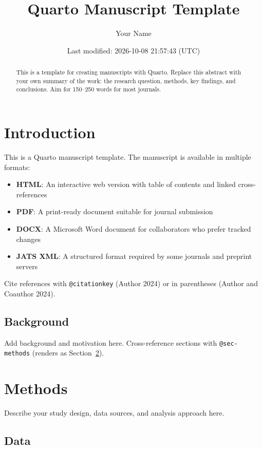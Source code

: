 \documentclass[
  letterpaper,
  DIV=11,
  numbers=noendperiod]{scrartcl}
\title{Quarto Manuscript Template}
\author{Your Name}
\date{Last modified: 2026-10-08 21:57:43 (UTC)}
\providecommand{\tightlist}{%
  \setlength{\itemsep}{0pt}\setlength{\parskip}{0pt}}
\begin{document}
\maketitle
\begin{abstract}
This is a template for creating manuscripts with Quarto. Replace this
abstract with your own summary of the work: the research question,
methods, key findings, and conclusions. Aim for 150--250 words for most
journals.
\end{abstract}


\section{Introduction}\label{sec-intro}

This is a Quarto manuscript template. The manuscript is available in
multiple formats:

\begin{itemize}
\tightlist
\item
  \textbf{HTML}: An interactive web version with table of contents and
  linked cross-references
\item
  \textbf{PDF}: A print-ready document suitable for journal submission
\item
  \textbf{DOCX}: A Microsoft Word document for collaborators who prefer
  tracked changes
\item
  \textbf{JATS XML}: A structured format required by some journals and
  preprint servers
\end{itemize}

Cite references with \texttt{@citationkey} (Author 2024) or in
parentheses (Author and Coauthor 2024).

\subsection{Background}\label{background}

Add background and motivation here. Cross-reference sections with
\texttt{@sec-methods} (renders as Section~\ref{sec-methods}).

\section{Methods}\label{sec-methods}

Describe your study design, data sources, and analysis approach here.

\subsection{Data}\label{data}
\end{document}
